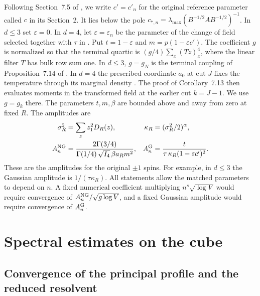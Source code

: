 \documentclass[11pt]{article}
\numberwithin{equation}{section}
\begin{document}
Following Section~7.5 of \cite{base}, we write $c'=c'_n$ for the
original reference parameter called $c$ in its Section~2. It lies below
the pole $c_{*,n}=\lambda_{\max}(B^{-1/2}AB^{-1/2})^{-1}$. In $d\le3$ set
$\varepsilon=0$. In $d=4$, let $\varepsilon=\varepsilon_n$ be the
parameter of the change of field selected together with $\tau$ in
\cite[Corollary~7.13]{base}. Put $t=1-\varepsilon$ and
$m=p(1-\varepsilon c')$. The coefficient $g$ is normalized so that
the terminal quartic is $(g/4)\sum_x(Tz)_x^4$, where the linear
filter $T$ has bulk row sum one. In $d\le3$, $g=g_N$ is the terminal
coupling of Proposition~7.14 of \cite{base}. In $d=4$ the prescribed
coordinate $a_0$ at cut $J$ fixes the temperature through its
marginal density \cite[Eq.~(7.43)]{base}. The proof of Corollary~7.13
then evaluates moments in the transformed field at the earlier cut
$k=J-1$. We use $g=g_k$ there. The
parameters $t,m,\beta$ are bounded above and away from zero at fixed
$R$. The amplitudes are
\begin{align}
 \sigma_R^2&=\sum_z z_1^2D_R(z),&
 \kappa_R&=(\sigma_R^2/2)^\alpha,\\
 A_n^{\rm NG}&=\frac{2\Gamma(3/4)}
 {\Gamma(1/4)\,\sqrt{I_4}\,\beta a_R m^2},&
 A_n^{\rm G}&=\frac{t}{\tau\,\kappa_R(1-\varepsilon c')^2}.
 \label{eq:amplitudes}
\end{align}
These are the amplitudes for the original $\pm1$ spins. For example,
in $d\le3$ the Gaussian amplitude is $1/(\tau\kappa_R)$. All statements
allow the matched parameters to depend on $n$. A fixed numerical
coefficient multiplying $n^s\sqrt{\log V}$ would require convergence
of $A_n^{\rm NG}/\sqrt{g\log V}$, and a fixed Gaussian amplitude
would require convergence of $A_n^{\rm G}$.

\appendix
\section{Spectral estimates on the cube}\label{app:spectral}
\subsection{Convergence of the principal profile and the reduced resolvent}
\end{document}
